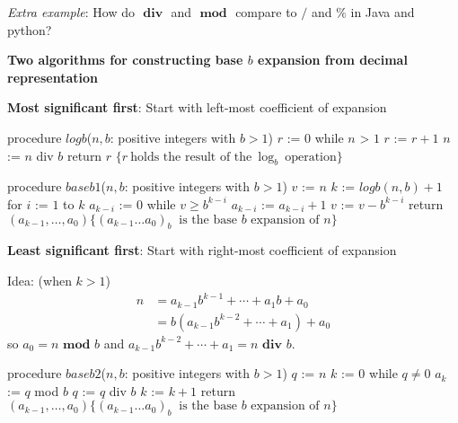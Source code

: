 \documentclass[12pt, oneside]{article}
\begin{document}
\textit{Extra example}: How do $\textbf{ div }$ and $\textbf{ mod }$ compare to $/$ and $\%$ in Java and python?

\vfill
 

{\bf Two algorithms for constructing base $b$ expansion from decimal representation}

{\bf Most significant first}: Start with left-most coefficient of expansion
\begin{multicols}{2}
\begin{algorithm}[caption={Calculating integer part of $\log_b$}]
procedure $\textit{logb}$($n, b$: positive integers with $b > 1$)
$r$ := $0$
while $n$ > $1$
  $r$ := $r + 1$
  $n$ := $n$ div $b$
return $r$ $\{ r~\textrm{holds the result of the}~\log_b~\textrm{operation}\}$
\end{algorithm}
\columnbreak
\begin{algorithm}[caption={Calculating base $b$ expansion, from left}]
procedure $\textit{baseb1}$($n, b$: positive integers with $b > 1$)
$v$ := $n$
$k$ := $logb(n,b) + 1$
for $i$ := $1$ to $k$
  $a_{k-i}$ := $0$
  while $v \geq b^{k-i}$
    $a_{k-i}$ := $a_{k-i} + 1$
    $v$ := $v -  b^{k-i}$
return $(a_{k-1}, \ldots, a_0) \{(a_{k-1} \ldots a_0)_b~\textrm{ is the base } b \textrm{ expansion of } n \}$
\end{algorithm}
\end{multicols}

\vfill
\vfill

{\bf Least significant first}: Start with right-most coefficient of expansion

\begin{multicols}{2}
  \begin{minipage}{3.2in}
    Idea: {\tiny(when $k > 1$)} 
    \begin{align*}
      n &= a_{k-1} b^{k-1} + \cdots + a_1 b + a_0 \\
        &= b ( a_{k-1} b^{k-2} + \cdots + a_1) + a_0\end{align*}
    so $a_0 = n \textbf{ mod } b$ and $a_{k-1} b^{k-2} + \cdots + a_1 = n \textbf{ div } b$.

\end{minipage}
\columnbreak
\begin{algorithm}[caption={Calculating base $b$ expansion, from right}]
procedure $\textit{baseb2}$($n, b$: positive integers with $b > 1$)
$q$ := $n$
$k$ := $0$
while $q  \neq 0$
  $a_{k}$ := $q$ mod $b$
  $q$ := $q$ div $b$
  $k$ := $k+1$
return $(a_{k-1}, \ldots, a_0) \{(a_{k-1} \ldots a_0)_b~\textrm{ is the base } b \textrm{ expansion of } n \}$
\end{algorithm}
\end{multicols}
\end{document}
